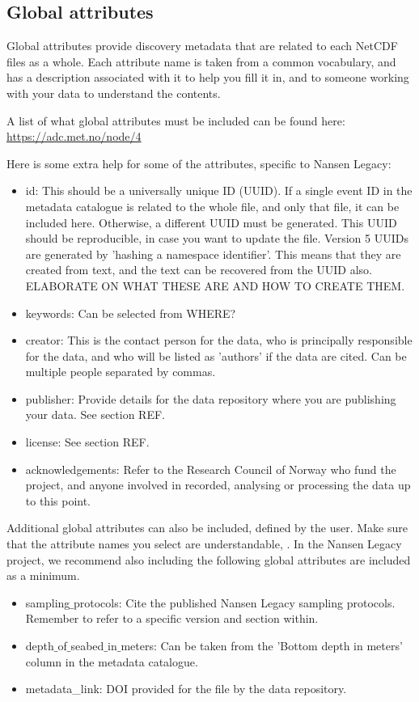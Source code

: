 \documentclass[a4paper,english, 11pt]{article}
\begin{document}
\subsection{Global attributes}
\label{ss:globalattributes}

Global attributes provide discovery metadata that are related to each NetCDF files as a whole. Each attribute name is taken from a common vocabulary, and has a description associated with it to help you fill it in, and to someone working with your data to understand the contents.

A list of what global attributes must be included can be found here:
\url{https://adc.met.no/node/4}

Here is some extra help for some of the attributes, specific to Nansen Legacy:
\begin{itemize}
\item id: This should be a universally unique ID (UUID). If a single event ID in the metadata catalogue is related to the whole file, and only that file, it can be included here. Otherwise, a different UUID must be generated. This UUID should be reproducible, in case you want to update the file. Version 5 UUIDs are generated by 'hashing a namespace identifier'. This means that they are created from text, and the text can be recovered from the UUID also. ELABORATE ON WHAT THESE ARE AND HOW TO CREATE THEM.
\item keywords: Can be selected from WHERE?
\item creator: This is the contact person for the data, who is principally responsible for the data, and who will be listed as 'authors' if the data are cited. Can be multiple people separated by commas.  
\item publisher: Provide details for the data repository where you are publishing your data. See section REF.
\item license: See section REF.
\item acknowledgements: Refer to the Research Council of Norway who fund the project, and anyone involved in recorded, analysing or processing the data up to this point.
\end{itemize}

Additional global attributes can also be included, defined by the user. Make sure that the attribute names you select are understandable, . In the Nansen Legacy project, we recommend also including the following global attributes are included as a minimum. 

\begin{itemize}
\item sampling$\_$protocols: Cite the published Nansen Legacy sampling protocols. Remember to refer to a specific version and section within.
\item depth$\_$of$\_$seabed$\_$in$\_$meters: Can be taken from the 'Bottom depth in meters' column in the metadata catalogue.
\item metadata_link: DOI provided for the file by the data repository.
\end{itemize}   
\end{document}
